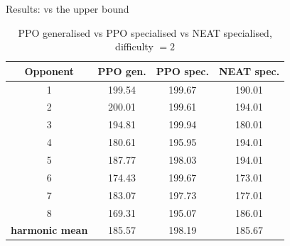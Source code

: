\documentclass[boxes]{beamer}
\begin{document}
\begin{frame}{Results: vs the upper bound}
      \begin{table}[htbp]
        \caption{PPO generalised vs PPO specialised vs NEAT specialised, difficulty $= 2$ }
        \begin{center}
            \begin{tabular}{|c|c|c|c|}
                \hline
                \textbf{Opponent}&\textbf{PPO gen.}&\textbf{PPO spec.}&\textbf{NEAT spec.} \\
                \hline
                 1 &  199.54 &  199.67 &  190.01 \\
                 2 &  200.01 &  199.61 &  194.01 \\
                 3 &  194.81 &  199.94 &  180.01 \\
                 4 &  180.61 &  195.95 &  194.01 \\
                 5 &  187.77 &  198.03 &  194.01 \\
                 6 &  174.43 &  199.67 &  173.01 \\
                 7 &  183.07 &  197.73 &  177.01 \\
                 8 &  169.31 &  195.07 &  186.01 \\
                \hline
                \textbf{harmonic mean} & 185.57 & 198.19 & 185.67 \\
                \hline
            \end{tabular}
            \label{PPO generalized vs specialized vs NEAT}
        \end{center}
      \end{table}
\end{frame}
\end{document}
